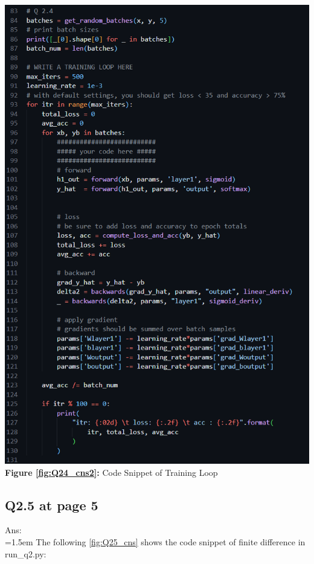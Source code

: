 \documentclass{article}
\begin{document}
	\begin{minipage}{0.48\linewidth}
		\centering
		\includegraphics[width=\linewidth]{./Q24_cns2.png}
		\textbf{Figure \ref{fig:Q24_cns2}:} Code Snippet of Training Loop  %
		\label{fig:Q24_cns2}         %
	\end{minipage}	
	
	\newpage
	\subsection*{Q2.5 at page 5}
	Ans:\\
	\hangindent=1.5em \hspace{1.5em}  The following \autoref{fig:Q25_cns} shows the code snippet of finite difference in run\_q2.py:
	\newline
\end{document}
